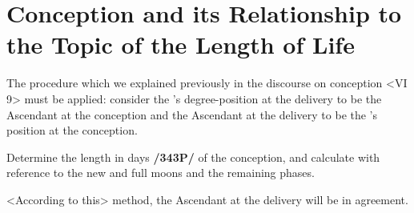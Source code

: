 \section{Conception and its Relationship to the Topic of the Length of Life}
 
The procedure which we explained previously in the discourse on conception <VI 9> must be applied: consider the \Moon’s degree-position at the delivery to be the Ascendant at the conception and the Ascendant at the delivery to be the \Moon’s position at the conception. 

Determine the length in days \textbf{/343P/} of the conception, and calculate with reference to the new and full moons and the remaining phases. 

<According to this> method, the Ascendant at the delivery will be in agreement.

\newpage
